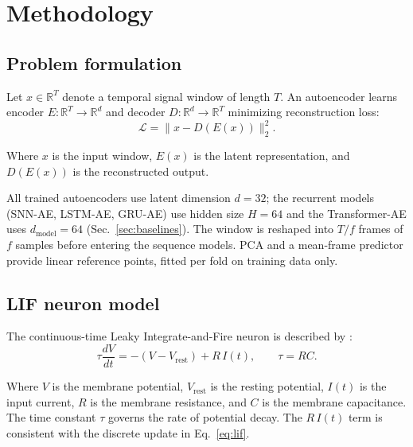 \documentclass[conference]{IEEEtran}
\begin{document}
\section{Methodology}

\subsection{Problem formulation}

\par Let $x \in \mathbb{R}^{T}$ denote a temporal signal window of length $T$.
An autoencoder learns encoder $E:\mathbb{R}^T \to \mathbb{R}^d$ and decoder
$D:\mathbb{R}^d \to \mathbb{R}^T$ minimizing reconstruction loss:
\begin{equation}
  \mathcal{L} = \|x - D(E(x))\|_2^2.
\end{equation}
\par Where $x$ is the input window, $E(x)$ is the latent representation, and $D(E(x))$ is the reconstructed output.

\par All trained autoencoders use latent dimension $d=32$; the recurrent models
(SNN-AE, LSTM-AE, GRU-AE) use hidden size $H=64$ and the Transformer-AE uses
$d_{\mathrm{model}}=64$ (Sec.~\ref{sec:baselines}). The window is reshaped into
$T/f$ frames of $f$ samples before entering the sequence models. PCA and a
mean-frame predictor provide linear reference points, fitted per fold on
training data only.

\subsection{LIF neuron model}

\par The continuous-time Leaky Integrate-and-Fire neuron is described by
\cite{gerstner2002spiking}:
\begin{equation}
  \tau \frac{dV}{dt} = -(V - V_{\mathrm{rest}}) + R\,I(t), \qquad \tau = RC.
\end{equation}
\par Where $V$ is the membrane potential, $V_{\mathrm{rest}}$ is the resting potential, $I(t)$ is the input current, $R$ is the membrane resistance, and $C$ is the membrane capacitance. The time constant $\tau$ governs the rate of potential decay. The $R\,I(t)$ term is consistent with the discrete update in Eq.~\eqref{eq:lif}.
\end{document}
